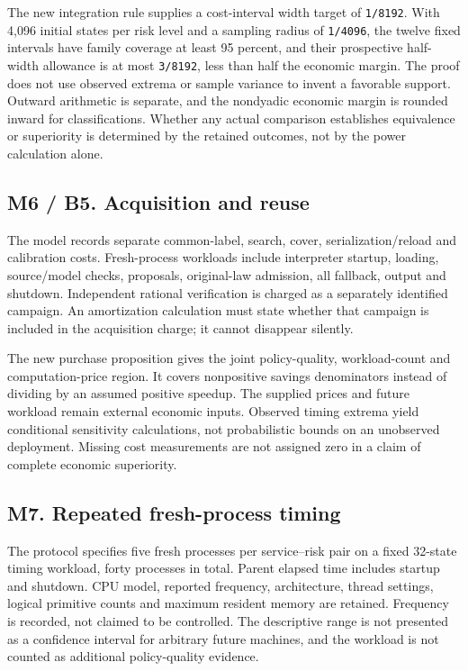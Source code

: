 The new integration rule supplies a cost-interval width target of
\texttt{1/8192}. With 4,096 initial states per risk level and a sampling
radius of \texttt{1/4096}, the twelve fixed intervals have family
coverage at least 95 percent, and their prospective half-width allowance
is at most \texttt{3/8192}, less than half the economic margin. The
proof does not use observed extrema or sample variance to invent a
favorable support. Outward arithmetic is separate, and the nondyadic
economic margin is rounded inward for classifications. Whether any
actual comparison establishes equivalence or superiority is determined
by the retained outcomes, not by the power calculation alone.

\hypertarget{m6-b5.-acquisition-and-reuse}{%
\subsection{M6 / B5. Acquisition and
reuse}\label{m6-b5.-acquisition-and-reuse}}

The model records separate common-label, search, cover,
serialization/reload and calibration costs. Fresh-process workloads
include interpreter startup, loading, source/model checks, proposals,
original-law admission, all fallback, output and shutdown. Independent
rational verification is charged as a separately identified campaign. An
amortization calculation must state whether that campaign is included in
the acquisition charge; it cannot disappear silently.

The new purchase proposition gives the joint policy-quality,
workload-count and computation-price region. It covers nonpositive
savings denominators instead of dividing by an assumed positive speedup.
The supplied prices and future workload remain external economic inputs.
Observed timing extrema yield conditional sensitivity calculations, not
probabilistic bounds on an unobserved deployment. Missing cost
measurements are not assigned zero in a claim of complete economic
superiority.

\hypertarget{m7.-repeated-fresh-process-timing}{%
\subsection{M7. Repeated fresh-process
timing}\label{m7.-repeated-fresh-process-timing}}

The protocol specifies five fresh processes per service--risk pair on a
fixed 32-state timing workload, forty processes in total. Parent elapsed
time includes startup and shutdown. CPU model, reported frequency,
architecture, thread settings, logical primitive counts and maximum
resident memory are retained. Frequency is recorded, not claimed to be
controlled. The descriptive range is not presented as a confidence
interval for arbitrary future machines, and the workload is not counted
as additional policy-quality evidence.

